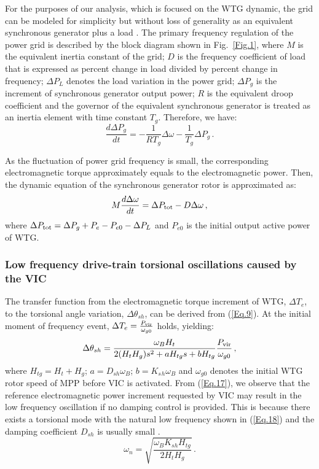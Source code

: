 \documentclass[journal]{IEEEtran}
\begin{document}
For the purposes of our analysis, which is focused on the WTG dynamic, the grid can be modeled for simplicity but without loss of generality as an equivalent synchronous generator plus a load \cite{Grigsby2015Power}.  The primary frequency regulation of the power grid is described by the block diagram shown in Fig.~\ref{Fig.1}, where $M$ is the equivalent inertia constant of the grid; $D$ is the frequency coefficient of load that is expressed as percent change in load divided by percent change in frequency; $\Delta P_L$ denotes the load variation in the power grid; $\Delta P_{g}$ is the increment of synchronous generator output power; $R$ is the equivalent droop coefficient and the governor of the equivalent synchronous generator is treated as an inertia element with time constant $T_g$.  Therefore, we have:
%
\begin{equation}
  \frac{d\Delta P_g}{dt}=-\frac{1}{RT_g} \Delta \omega -
  \frac{1}{T_g}\Delta P_g \, .
  \label{Eq.15}
\end{equation}

As the fluctuation of power grid frequency is small, the corresponding electromagnetic torque approximately equals to the electromagnetic power. Then, the dynamic equation of the synchronous generator rotor is approximated as:
%
\begin{equation}
  M\frac{d \Delta \omega}{dt}= \Delta P_{\rm tot} -D  \Delta \omega \, ,
  \label{Eq.16}
\end{equation}
where $\Delta P_{\rm tot} = \Delta P_g+P_e-P_{e0} - \Delta P_L$ and $P_{e0}$ is the initial output active power of WTG.

\subsubsection{Low frequency drive-train torsional oscillations caused by the VIC}

The transfer function from the electromagnetic torque increment of WTG, $\Delta T_e$, to the torsional angle variation, $\Delta \theta_{sh}$, can be derived from (\ref{Eq.9}). At the initial moment of frequency event, $\Delta T_e=\frac{P_{\rm vir}}{\omega_{g0}}$ holds, yielding:
%
\begin{equation}
  \Delta \theta_{sh}=\frac{\omega_B H_t}{2(H_t H_g)s^2 +
    a H_{tg}s+bH_{tg}}
  \frac{P_{\rm vir}}{\omega_{g0}} \, ,
  \label{Eq.17}
\end{equation}
%
where $H_{tg} =H_t+H_g$; $a = D_{sh} {\omega_B}$; $b=K_s{_h{\omega_B}}$ and $\omega_{g0}$ denotes the initial WTG rotor speed of MPP before VIC is activated. From (\ref{Eq.17}), we observe that the reference electromagnetic power increment requested by VIC may result in the low frequency oscillation if no damping control is provided. This is because there exists a torsional mode with the natural low frequency shown in (\ref{Eq.18}) and the damping coefficient $D_{sh}$ is usually small \cite{Rahimi2018Improvement}.
%
\begin{equation}
  \omega_n=\sqrt{\frac{\omega_BK_{sh}H_{tg}}{2H_tH_g}} \, .
  \label{Eq.18}
\end{equation}
\end{document}
